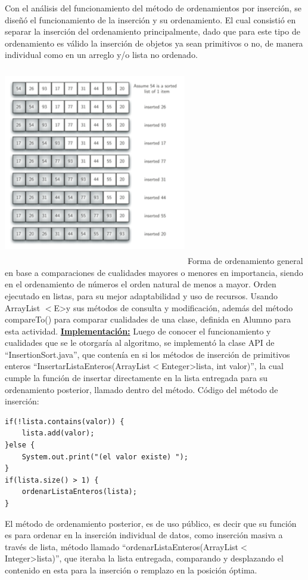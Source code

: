 \documentclass[12pt,letterpaper]{article}
\begin{document}
\vskip 0.4cm
Con el análisis del funcionamiento del método de ordenamientos por inserción, se diseñó el funcionamiento de la inserción y su ordenamiento. El cual consistió en separar la inserción del ordenamiento principalmente, dado que para este tipo de ordenamiento es válido la inserción de objetos ya sean primitivos o no, de manera individual como en un arreglo y/o lista no ordenado.
\vskip 0.4cm
\includegraphics[width=8cm,height=9cm]{Imagen4} 
\vskip 0.4cm
Forma de ordenamiento general en base a comparaciones de cualidades mayores o menores en importancia, siendo en el ordenamiento de números el orden natural de menos a mayor.
\vskip 0.4cm
Orden ejecutado en listas, para su mejor adaptabilidad y uso de recursos.
\vskip 0.4cm
Usando ArrayList $<$E\textgreater y sus métodos de consulta y modificación, además del método compareTo() para comparar cualidades de una clase, definida en Alumno para esta actividad.
\vskip 0.4cm
{\bf\underline {Implementación:}}
\vskip 0.4cm
Luego de conocer el funcionamiento y cualidades que se le otorgaría al algoritmo, se implementó la clase API de “InsertionSort.java”, que contenía en si los métodos de inserción de primitivos enteros “InsertarListaEnteros(ArrayList$<$Enteger\textgreater lista, int valor)”, la cual cumple la función de insertar directamente en la lista entregada para su ordenamiento posterior, llamado dentro del método.
\vskip 0.4cm
Código del método de inserción:
\vskip 0.4cm
\begin{lstlisting}
if(!lista.contains(valor)) {
	lista.add(valor);
}else {
	System.out.print("(el valor existe) ");
}	
if(lista.size() > 1) {
	ordenarListaEnteros(lista);
}
\end{lstlisting}
\vskip 0.4cm
El método de ordenamiento posterior, es de uso público, es decir que su función es para ordenar en la inserción individual de datos, como inserción masiva a través de lista, método llamado “ordenarListaEnteros(ArrayList$<$Integer\textgreater lista)”, que iteraba la lista entregada, comparando y desplazando el contenido en esta para la inserción o remplazo en la posición óptima.
\end{document}
